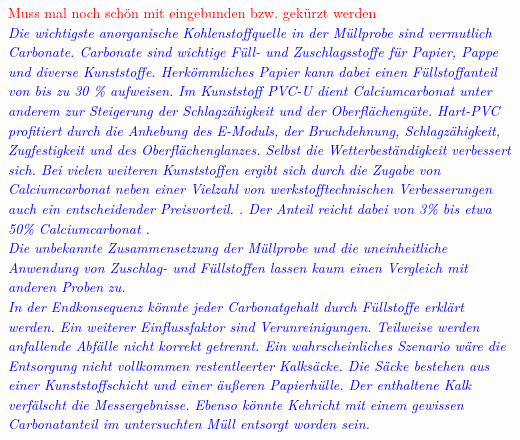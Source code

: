 \textcolor{red}{Muss mal noch schön mit eingebunden bzw. gekürzt werden}\\
\textcolor{blue}{\textit{Die wichtigste anorganische Kohlenstoffquelle in der Müllprobe sind vermutlich Carbonate.
Carbonate sind wichtige Füll- und Zuschlagsstoffe für Papier, Pappe und diverse Kunststoffe. Herkömmliches Papier kann dabei einen Füllstoffanteil von bis zu 30 \% \cite{Wikipedia.21.11.2019} aufweisen. Im Kunststoff PVC-U dient Calciumcarbonat unter anderem zur Steigerung der Schlagzähigkeit und der Oberflächengüte. Hart-PVC profitiert durch die Anhebung des E-Moduls, der Bruchdehnung, Schlagzähigkeit, Zugfestigkeit und des Oberflächenglanzes. Selbst die Wetterbeständigkeit verbessert sich. Bei vielen weiteren Kunststoffen ergibt sich durch die Zugabe von Calciumcarbonat neben einer Vielzahl von werkstofftechnischen Verbesserungen auch ein  entscheidender Preisvorteil. \cite{domininghausKunststoffeUndIhre1998}. Der Anteil reicht dabei von 3\% bis etwa 50\% Calciumcarbonat \cite{domininghausKunststoffeUndIhre1998}.\\
Die unbekannte Zusammensetzung der Müllprobe und die uneinheitliche Anwendung von Zuschlag- und Füllstoffen lassen kaum einen Vergleich mit anderen Proben zu. \\
In der Endkonsequenz könnte jeder Carbonatgehalt durch Füllstoffe erklärt werden. Ein weiterer Einflussfaktor sind Verunreinigungen. Teilweise werden anfallende Abfälle nicht korrekt getrennt. Ein wahrscheinliches Szenario wäre die Entsorgung nicht vollkommen restentleerter Kalksäcke. Die Säcke bestehen aus einer Kunststoffschicht und einer äußeren Papierhülle. Der enthaltene Kalk verfälscht die Messergebnisse. Ebenso könnte Kehricht mit einem gewissen Carbonatanteil im untersuchten Müll entsorgt worden sein.}}

\newpage

